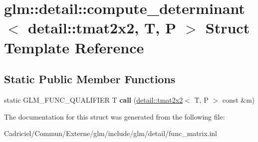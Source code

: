 \hypertarget{structglm_1_1detail_1_1compute__determinant_3_01detail_1_1tmat2x2_00_01_t_00_01_p_01_4}{}\section{glm\+:\+:detail\+:\+:compute\+\_\+determinant$<$ detail\+:\+:tmat2x2, T, P $>$ Struct Template Reference}
\label{structglm_1_1detail_1_1compute__determinant_3_01detail_1_1tmat2x2_00_01_t_00_01_p_01_4}
\subsection*{Static Public Member Functions}
\begin{DoxyCompactItemize}
\item 
static G\+L\+M\+\_\+\+F\+U\+N\+C\+\_\+\+Q\+U\+A\+L\+I\+F\+I\+ER T {\bfseries call} (\hyperlink{structglm_1_1detail_1_1tmat2x2}{detail\+::tmat2x2}$<$ T, P $>$ const \&m)\hypertarget{structglm_1_1detail_1_1compute__determinant_3_01detail_1_1tmat2x2_00_01_t_00_01_p_01_4_a58a62a3968a9af7acd4522972236742e}{}\label{structglm_1_1detail_1_1compute__determinant_3_01detail_1_1tmat2x2_00_01_t_00_01_p_01_4_a58a62a3968a9af7acd4522972236742e}

\end{DoxyCompactItemize}


The documentation for this struct was generated from the following file\+:\begin{DoxyCompactItemize}
\item 
Cadriciel/\+Commun/\+Externe/glm/include/glm/detail/func\+\_\+matrix.\+inl\end{DoxyCompactItemize}
